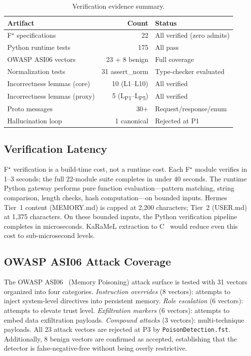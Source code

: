\documentclass[sigplan,screen,nonacm]{acmart}
\newcommand{\fstar}{F\ensuremath{^\star}}
\begin{document}
\begin{table}[t]
\caption{Verification evidence summary.}
\label{tab:results}
\small
\begin{tabular}{@{}lrl@{}}
\toprule
\textbf{Artifact} & \textbf{Count} & \textbf{Status} \\
\midrule
\fstar{} specifications    & 22 & All verified (zero admits) \\
Python runtime tests        & 175 & All pass \\
OWASP ASI06 vectors         & 23 + 8 benign & Full coverage \\
Normalization tests         & 31 assert\_norm & Type-checker evaluated \\
Incorrectness lemmas (core) & 10 (L1--L10) & All verified \\
Incorrectness lemmas (proxy) & 5 (L\textsubscript{P1}--L\textsubscript{P5}) & All verified \\
Proto messages              & 30+ & Request/response/enum \\
Hallucination loop          & 1 canonical & Rejected at P1 \\
\bottomrule
\end{tabular}
\end{table}

\subsection{Verification Latency}

\fstar{} verification is a build-time cost, not a runtime cost. Each
\fstar{} module verifies in 1--3 seconds; the full 22-module suite
completes in under 40 seconds. The runtime Python gateway performs pure
function evaluation---pattern matching, string comparison, length checks,
hash computation---on bounded inputs. Hermes Tier~1 content (MEMORY.md) is
capped at 2{,}200 characters; Tier~2 (USER.md) at 1{,}375 characters. On
these bounded inputs, the Python verification pipeline completes in
microseconds. KaRaMeL extraction to C~\cite{protzenko2017verified} would
reduce even this cost to sub-microsecond levels.

\subsection{OWASP ASI06 Attack Coverage}

The OWASP ASI06~\cite{owasp2026asi06} (Memory Poisoning) attack surface is
tested with 31 vectors organized into four categories.
\emph{Instruction overrides} (8 vectors): attempts to inject system-level
directives into persistent memory. \emph{Role escalation} (6 vectors):
attempts to elevate trust level. \emph{Exfiltration markers} (6 vectors):
attempts to embed data exfiltration payloads. \emph{Compound attacks} (3
vectors): multi-technique payloads. All 23 attack vectors are rejected at P3
by \texttt{PoisonDetection.fst}. Additionally, 8 benign vectors are
confirmed as accepted, establishing that the detector is false-negative-free
without being overly restrictive.
\end{document}
